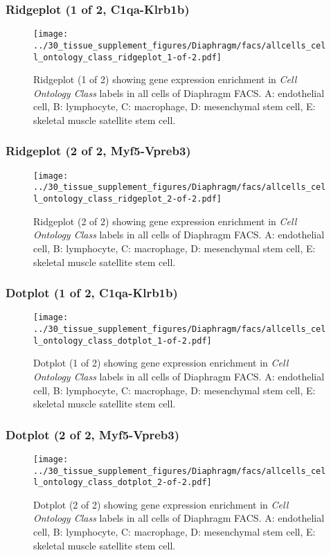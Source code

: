 \subsubsection{Ridgeplot (1 of 2, C1qa-Klrb1b)}
\begin{figure}[h]
\centering
\texttt{[image: ../30\_tissue\_supplement\_figures/Diaphragm/facs/allcells\_cell\_ontology\_class\_ridgeplot\_1-of-2.pdf]}

\caption{ Ridgeplot (1 of 2)  showing gene expression enrichment in \emph{Cell Ontology Class} labels in all cells of Diaphragm FACS. A: endothelial cell, B: lymphocyte, C: macrophage, D: mesenchymal stem cell, E: skeletal muscle satellite stem cell.}
\end{figure}


\clearpage

\subsubsection{Ridgeplot (2 of 2, Myf5-Vpreb3)}
\begin{figure}[h]
\centering
\texttt{[image: ../30\_tissue\_supplement\_figures/Diaphragm/facs/allcells\_cell\_ontology\_class\_ridgeplot\_2-of-2.pdf]}

\caption{ Ridgeplot (2 of 2)  showing gene expression enrichment in \emph{Cell Ontology Class} labels in all cells of Diaphragm FACS. A: endothelial cell, B: lymphocyte, C: macrophage, D: mesenchymal stem cell, E: skeletal muscle satellite stem cell.}
\end{figure}


\clearpage

\subsubsection{Dotplot (1 of 2, C1qa-Klrb1b)}
\begin{figure}[h]
\centering
\texttt{[image: ../30\_tissue\_supplement\_figures/Diaphragm/facs/allcells\_cell\_ontology\_class\_dotplot\_1-of-2.pdf]}

\caption{ Dotplot (1 of 2)  showing gene expression enrichment in \emph{Cell Ontology Class} labels in all cells of Diaphragm FACS. A: endothelial cell, B: lymphocyte, C: macrophage, D: mesenchymal stem cell, E: skeletal muscle satellite stem cell.}
\end{figure}


\clearpage

\subsubsection{Dotplot (2 of 2, Myf5-Vpreb3)}
\begin{figure}[h]
\centering
\texttt{[image: ../30\_tissue\_supplement\_figures/Diaphragm/facs/allcells\_cell\_ontology\_class\_dotplot\_2-of-2.pdf]}

\caption{ Dotplot (2 of 2)  showing gene expression enrichment in \emph{Cell Ontology Class} labels in all cells of Diaphragm FACS. A: endothelial cell, B: lymphocyte, C: macrophage, D: mesenchymal stem cell, E: skeletal muscle satellite stem cell.}
\end{figure}


